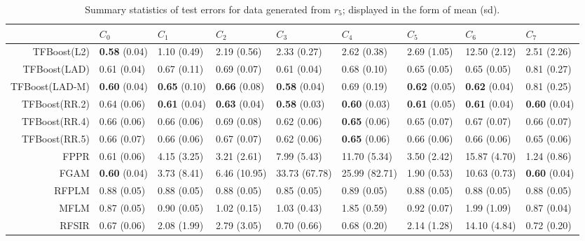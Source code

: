 \begin{table}[H]
\centering
\begin{tabular}{rllllllll}
  \hline
 & $C_0$ & $C_1$ & $C_2$ & $C_3$ & $C_4$ & $C_5$ & $C_6$ & $C_7$ \\ 
  \hline
TFBoost(L2) & \textbf{0.58} (0.04) & 1.10 (0.49) & 2.19 (0.56) & 2.33 (0.27) & 2.62 (0.38) & 2.69 (1.05) & 12.50 (2.12) & 2.51 (2.26) \\ 
  TFBoost(LAD) & 0.61 (0.04) & 0.67 (0.11) & 0.69 (0.07) & 0.61 (0.04) & 0.68 (0.10) & 0.65 (0.05) & 0.65 (0.05) & 0.81 (0.27) \\ 
  TFBoost(LAD-M) & \textbf{0.60} (0.04) & \textbf{0.65} (0.10) & \textbf{0.66} (0.08) & \textbf{0.58} (0.04) & 0.69 (0.19) & \textbf{0.62} (0.05) & \textbf{0.62} (0.04) & 0.81 (0.25) \\ 
  TFBoost(RR.2) & 0.64 (0.06) & \textbf{0.61} (0.04) & \textbf{0.63} (0.04) & \textbf{0.58} (0.03) & \textbf{0.60} (0.03) & \textbf{0.61} (0.05) & \textbf{0.61} (0.04) & \textbf{0.60} (0.04) \\ 
  TFBoost(RR.4) & 0.66 (0.06) & 0.66 (0.06) & 0.69 (0.08) & 0.62 (0.06) & \textbf{0.65} (0.06) & 0.65 (0.07) & 0.67 (0.07) & 0.66 (0.07) \\ 
  TFBoost(RR.5) & 0.66 (0.07) & 0.66 (0.06) & 0.67 (0.07) & 0.62 (0.06) & \textbf{0.65} (0.06) & 0.66 (0.06) & 0.66 (0.06) & 0.65 (0.06) \\ 
  FPPR & 0.61 (0.06) & 4.15 (3.25) & 3.21 (2.61) & 7.99 (5.43) & 11.70 (5.34) & 3.50 (2.42) & 15.87 (4.70) & 1.24 (0.86) \\ 
  FGAM & \textbf{0.60} (0.04) & 3.73 (8.41) & 6.46 (10.95) & 33.73 (67.78) & 25.99 (82.71) & 1.90 (0.53) & 10.63 (0.73) & \textbf{0.60} (0.04) \\ 
  RFPLM & 0.88 (0.05) & 0.88 (0.05) & 0.88 (0.05) & 0.85 (0.05) & 0.89 (0.05) & 0.88 (0.05) & 0.88 (0.05) & 0.88 (0.05) \\ 
  MFLM & 0.87 (0.05) & 0.90 (0.05) & 1.02 (0.15) & 1.03 (0.43) & 1.85 (0.59) & 0.92 (0.07) & 1.99 (1.09) & 0.87 (0.04) \\ 
  RFSIR & 0.67 (0.06) & 2.08 (1.99) & 2.79 (3.05) & 0.70 (0.66) & 0.68 (0.20) & 2.14 (1.28) & 14.10 (4.84) & 0.72 (0.20) \\ 
   \hline
\end{tabular}
\caption{Summary statistics of test errors for data generated from $r_5$; displayed in the form of mean (sd).} 
\end{table}
